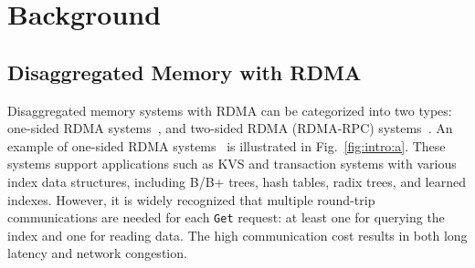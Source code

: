 \vspace{-2ex}
\section{Background}
\label{sec:background}
\vspace{-.5ex}

\subsection{Disaggregated Memory with RDMA}



\iffalse
\begin{figure*}[!t]
\centering
\subfigure[An exmaple of one-sided RDMA.]{
    \label{fig:intro:a}
    \texttt{[image: Figures/intro-1.pdf]}}
    \hspace{2ex}
\subfigure[\texttt{Get} data with RPC and B+tree.]{
    \label{fig:intro:b}
    \texttt{[image: Figures/intro-2.pdf]}}
    \hspace{2ex}
\subfigure[\texttt{Get} data with RPC and hash table.]{
    \label{fig:intro:c}
    \texttt{[image: Figures/intro-3.pdf]}}
\vspace{-2ex}
\caption{Examples of accessing different remote storage backends.}
\label{fig:intro}
\end{figure*}
\fi


Disaggregated memory systems with RDMA can be categorized into two types: one-sided RDMA systems~\cite{sherman,race,cell,rolex,smart}, and two-sided RDMA (RDMA-RPC) systems~\cite{fasst, guidelines}. An example of one-sided RDMA systems~\cite{sherman,race,cell,rolex,smart} is illustrated in Fig.~\ref{fig:intro:a}. These systems support applications such as KVS and transaction systems with various index data structures, including B/B+ trees, hash tables, radix trees, and learned indexes. However, it is widely recognized that multiple round-trip communications are needed for each \texttt{Get} request: at least one for querying the index and one for reading data. The high communication cost results in both long latency and network congestion. %


